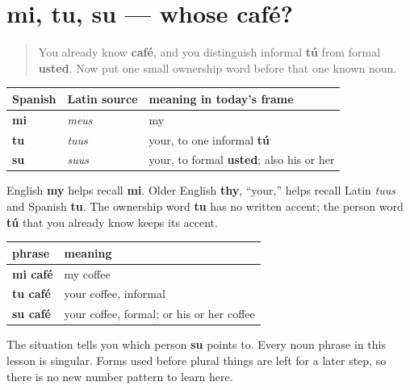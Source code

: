 \section[mi, tu, su]{mi, tu, su — whose café?}

\label{lesson:ES-C10-mi-tu-su}



\begin{quote}
You already know \textbf{café}, and you distinguish informal \textbf{tú} from formal \textbf{usted}. Now put one small ownership word before that one known noun.
\end{quote}

\begin{cousinweb}
\noindent
\begin{tabularx}{\linewidth}{@{}>{\raggedright\arraybackslash}X>{\raggedright\arraybackslash}X>{\raggedright\arraybackslash}X@{}}
\toprule
\textbf{Spanish} & \textbf{Latin source} & \textbf{meaning in today's frame} \\
\midrule
\textbf{mi} & \emph{meus} & my \\
\textbf{tu} & \emph{tuus} & your, to one informal \textbf{tú} \\
\textbf{su} & \emph{suus} & your, to formal \textbf{usted}; also his or her \\
\bottomrule
\end{tabularx}

English \textbf{my} helps recall \textbf{mi}. Older English \textbf{thy}, “your,” helps recall Latin \emph{tuus} and Spanish \textbf{tu}. The ownership word \textbf{tu} has no written accent; the person word \textbf{tú} that you already know keeps its accent.
\end{cousinweb}

\begin{grammarlens}[title={Grammar Lens: put the ownership word before the noun}]
\noindent
\begin{tabularx}{\linewidth}{@{}>{\raggedright\arraybackslash}X>{\raggedright\arraybackslash}X@{}}
\toprule
\textbf{phrase} & \textbf{meaning} \\
\midrule
\textbf{mi café} & my coffee \\
\textbf{tu café} & your coffee, informal \\
\textbf{su café} & your coffee, formal; or his or her coffee \\
\bottomrule
\end{tabularx}

The situation tells you which person \textbf{su} points to. Every noun phrase in this lesson is singular. Forms used before plural things are left for a later step, so there is no new number pattern to learn here.
\end{grammarlens}

